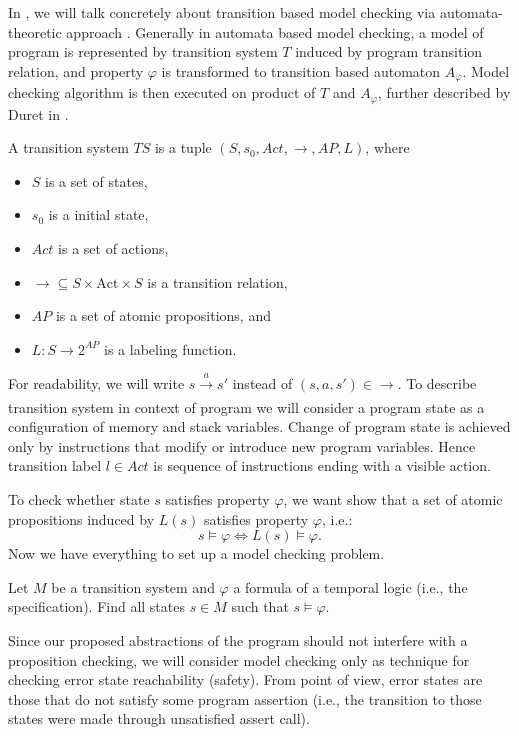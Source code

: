 In \DIVINE, we will talk concretely about transition based model checking
via automata-theoretic approach \cite{Vardi96}. Generally in automata based model checking,
a model of program is represented by transition system $T$ induced by program
transition relation, and property $\varphi$ is transformed to transition based
automaton $A_\varphi$. Model checking algorithm is then executed on product
of $T$ and $A_\varphi$, further described by Duret in \cite{Duret04}.

\begin{definition}\label{def:ts}
A transition system $TS$ is a tuple $(S, s_0, Act, \longrightarrow, AP, L)$, where
\begin{itemize}
    \item $S$ is a set of states,
    \item $s_0$ is a initial state,
    \item $Act$ is a set of actions,
    \item $\longrightarrow \subseteq S \times \mathrm{Act} \times S$ is a
    transition relation,
    \item $AP$ is a set of atomic propositions, and
    \item $L \colon S \rightarrow 2^{AP}$ is a labeling function.
\end{itemize}
\end{definition}
\noindent
For readability, we will write $s \xrightarrow[]{a} s'$ instead of $(s, a, s') \in
\longrightarrow$. To describe transition system in context of \LLVM program we
will consider a program state as a configuration of memory and stack variables.
Change of program state is achieved only by instructions that modify or
introduce new program variables. Hence transition label $l \in Act$ is sequence
of \LLVM instructions ending with a visible action.

To check whether state $s$ satisfies property $\varphi$, we want show that a set of
atomic propositions induced by $L(s)$ satisfies property $\varphi$, i.e.:
$$ s \models \varphi \iff L(s) \models \varphi.$$
Now we have everything to set up a model checking problem.

\begin{definition}\label{def:mc}
Let $M$ be a transition system and $\varphi$ a
formula of a temporal logic (i.e., the specification). Find all states $s \in M$
such that $s \models \varphi$.
\end{definition}

Since our proposed abstractions of the program should not interfere
with a proposition checking, we will consider model checking only as technique for
checking error state reachability (safety). From \LLVM point of view, error states are
those that do not satisfy some program assertion (i.e., the transition to
those states were made through unsatisfied assert call).

